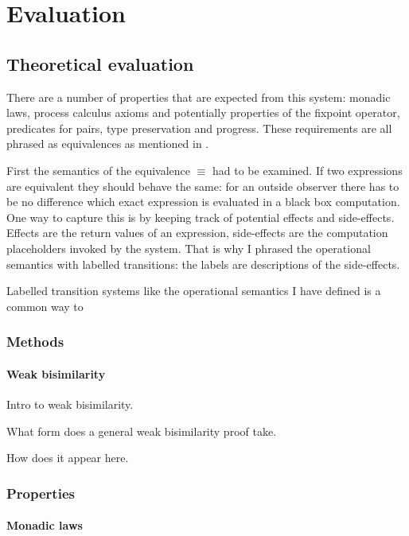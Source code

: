 \documentclass[12pt,twoside,notitlepage]{report}
\begin{document}
\cleardoublepage
\chapter{Evaluation}

\section{Theoretical evaluation}
\label{sec:behave_equiv}
There are a number of properties that are expected from this system: monadic laws, process calculus axioms and potentially properties of the fixpoint operator, predicates for pairs, type preservation and progress. These requirements are all phrased as equivalences as mentioned in . 

First the semantics of the equivalence $ \equiv $ had to be examined. If two expressions are equivalent they should behave the same: for an outside observer there has to be no difference which exact expression is evaluated in a black box computation. One way to capture this is by keeping track of potential effects and side-effects. Effects are the return values of an expression, side-effects are the computation placeholders invoked by the system. That is why I phrased the operational semantics with labelled transitions: the labels are descriptions of the side-effects.

Labelled transition systems like the operational semantics I have defined is a common way to 

\subsection{Methods}



\subsubsection{Weak bisimilarity}
Intro to weak bisimilarity.


What form does a general weak bisimilarity proof take.


How does it appear here.
\subsection{Properties}
\subsubsection{Monadic laws}
\end{document}
